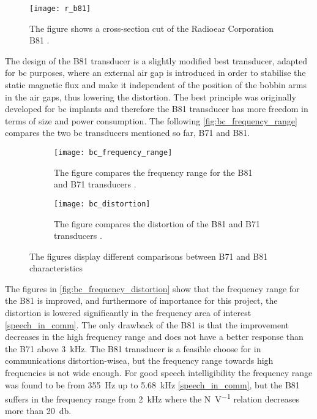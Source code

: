  \begin{figure}[H]
	\centering
		\texttt{[image: r\_b81]}
		\caption{The figure shows a cross-section cut of the Radioear Corporation B81  \citep{the_balanced_2003}.}
		\label{fig:r_b81}
\end{figure}

The design of the B81 transducer is a slightly modified \gls{best} transducer, adapted for \gls{bc} purposes, where an external air gap is introduced in order to stabilise the static magnetic flux and make it independent of the position of the bobbin arms in the air gaps, thus lowering the distortion.  The \gls{best} principle was originally developed for \gls{bc} implants and therefore the B81 transducer has more freedom in terms of size and power consumption. The following \autoref{fig:bc_frequency_range} compares the two \gls{bc} transducers mentioned so far, B71 and B81.


\begin{figure}[H]
\centering
\begin{subfigure}[htbp]{0.48\textwidth}
		\texttt{[image: bc\_frequency\_range]}
		\caption{The figure compares the frequency range for the B81 and B71 transducers \citep{the_balanced_2003}.}
		\label{fig:bc_frequency_range}
\end{subfigure}\hspace{10pt}
\begin{subfigure}[htbp]{0.48\textwidth}
		\texttt{[image: bc\_distortion]}
		\caption{The figure compares the distortion of the B81 and B71 transducers \citep{the_balanced_2003}.}
		\label{fig:bc_distortion}
\end{subfigure} 
\caption{The figures display different comparisons between B71 and B81 characteristics}
\label{fig:bc_frequency_distortion}
\end{figure}



The figures in \autoref{fig:bc_frequency_distortion} show that the frequency range for the B81 is improved, and furthermore of importance for this project, the distortion is lowered significantly in the frequency area of interest \autoref{speech_in_comm}. The only drawback of the B81 is that the improvement decreases in the high frequency range and does not have a better response than the B71 above \SI{3}{\kilo\hertz}. The B81 transducer is a feasible choose for  in communications distortion-wisea, but the frequency range towards high frequencies is not wide enough. For good speech intelligibility the frequency range was found to be from \SI{355}{\hertz} up to \SI{5.68}{\kilo\hertz}  \autoref{speech_in_comm}, but the B81 suffers in the frequency range from \SI{2}{\kilo\hertz} where the \si{\newton\per\volt} relation decreases more than \SI{20}{\decibel}.







